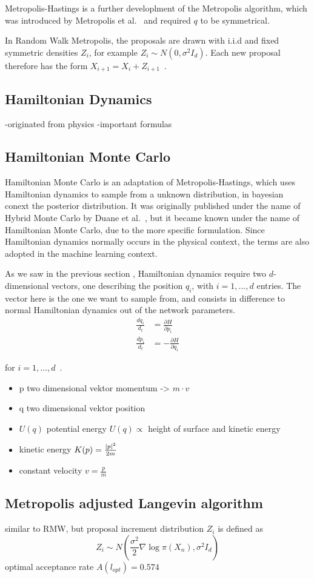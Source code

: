 Metropolis-Hastings is a further developlment of the Metropolis algorithm, which was introduced by Metropolis et al.~\cite{metropolis1953} and required $q$ to be symmetrical.

In Random Walk Metropolis, the proposals are drawn with i.i.d and fixed symmetric densities $Z_i$,
for example $Z_i\sim N(0,\sigma^2 I_d)$.
Each new proposal therefore has the form $X_{i+1} = X_i + Z_{i+1}$~\cite{rosenthal2011optimal}.
\subsection{Hamiltonian Dynamics}
-originated from physics
-important formulas
\subsection{Hamiltonian Monte Carlo}
Hamiltonian Monte Carlo is an adaptation of Metropolis-Hastings, which uses 
Hamiltonian dynamics to sample from a unknown distribution, in bayesian conext the posterior distribution.
It was originally published under the name of Hybrid Monte Carlo by Duane et al.~\cite{DUANE1987216}, but 
it became known under the name of Hamiltonian Monte Carlo, due to the more specific formulation.
Since Hamiltonian dynamics normally occurs in the physical context, the terms are also adopted in the machine learning context.

As we saw in the previous section , Hamiltonian dynamics require two $d$-dimensional vectors, one describing the position $q_i$, with $i=1,...,d$ entries. 
The vector here is the one we want to sample from, and consists in difference to normal Hamiltonian dynamics out of the network parameters. 
\begin{align*}
    \frac{dq_i}{d_t}&=\frac{\partial H}{\partial p_i} \\
    \frac{dp_i}{d_t}&=-\frac{\partial H}{\partial q_i}
\end{align*}

for $i=1,...,d$~\cite{MR2858447}. 


  

\begin{itemize}
    \item p two dimensional vektor momentum -> $m\cdot v$
    \item q two dimensional vektor position 
    \item $U(q)$ potential energy $U(q)\propto$ height of surface and kinetic energy
    \item kinetic energy $K(p)=\frac{\left\lvert p\right\rvert^2}{2m}$
    \item constant velocity $v=\frac{p}{m}$
\end{itemize}   
\subsection{Metropolis adjusted Langevin algorithm}
similar to RMW, but proposal increment distribution $Z_i$ is defined as 
\[
Z_i \sim N(\frac{\sigma^2}{2}\nabla\log\pi(X_n),\sigma^2I_d)
\]
optimal acceptance rate $A(l_{opt})=0.574$

